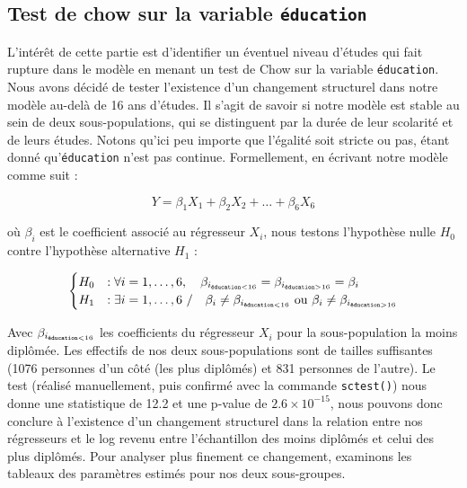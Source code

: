 \documentclass[a4paper, french, 11 pt]{article}\usepackage[]{graphicx}\usepackage[]{xcolor}
\begin{document}
\subsection{Test de chow sur la variable \texttt{éducation}}



L’intérêt de cette partie est d’identifier un éventuel niveau d’études qui fait rupture dans le modèle en menant un test de Chow sur la variable \texttt{éducation}. Nous avons décidé de tester l’existence d’un changement structurel dans notre modèle au-delà de 16 ans d’études. Il s’agit de savoir si notre modèle est stable au sein de deux sous-populations, qui se distinguent par la durée de leur scolarité et de leurs études. Notons qu’ici peu importe que l’égalité soit stricte ou pas, étant donné qu’\texttt{éducation} n’est pas continue. Formellement, en écrivant notre modèle comme suit :

\[Y = \beta_1X_1 + \beta_2X_2 + \dots + \beta_6X_6\] 

\noindent où $\beta_i$ est le coefficient associé au régresseur $X_i$, nous testons l'hypothèse nulle $H_0$ contre l'hypothèse alternative $H_1$ :

\[\begin{cases} H_0 &: \forall i=1, \dots, 6, \quad\beta_{i_{\texttt{\tiny éducation}<16}}=\beta_{i_{\texttt{\tiny éducation}>16} }= \beta_i \\ H_1 &: \exists i=1,\dots,6\ / \quad \beta_i\neq \beta_{i_{\texttt{\tiny éducation}<16}} \text{ ou } \beta_i\neq\beta_{i_{\texttt{\tiny éducation}>16} } \end{cases}\]



Avec $\beta_{i_{\texttt{\tiny éducation}<16} }$ les coefficients du régresseur $X_i$ pour la sous-population la moins diplômée. Les effectifs de nos deux sous-populations sont de tailles suffisantes (1076 personnes d'un côté (les plus diplômés) et 831 personnes de l'autre). Le test (réalisé manuellement, puis confirmé avec la commande \texttt{sctest()}) nous donne une statistique de 12.2 et une p-value de \ensuremath{2.6\times 10^{-15}}, nous pouvons donc conclure à l'existence d'un changement structurel dans la relation entre nos régresseurs et le log revenu entre l'échantillon des moins diplômés et celui des plus diplômés. Pour analyser plus finement ce changement, examinons les tableaux des paramètres estimés pour nos deux sous-groupes. 
\end{document}
